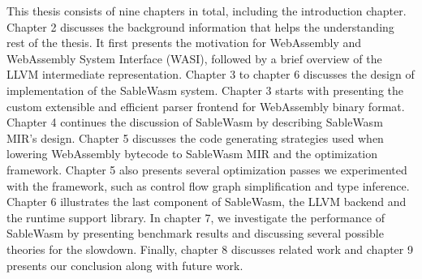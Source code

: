 This thesis consists of nine chapters in total, including the introduction
chapter.
Chapter 2 discusses the background information that helps the
understanding rest of the thesis. It first presents the motivation for
WebAssembly and WebAssembly System Interface (WASI), followed by a brief
overview of the LLVM intermediate representation.
Chapter 3 to chapter 6 discusses the design of implementation of the
SableWasm system. Chapter 3 starts with presenting the custom extensible and
efficient parser frontend for WebAssembly binary format.
Chapter 4 continues the discussion of SableWasm by describing SableWasm MIR's
design.
Chapter 5 discusses the code generating strategies used when
lowering WebAssembly bytecode to SableWasm MIR and the optimization framework.
Chapter 5 also presents several optimization passes we experimented with the
framework, such as control flow graph simplification and type inference.
Chapter 6 illustrates the last component of SableWasm, the LLVM backend and the
runtime support library.
In chapter 7, we investigate the performance of SableWasm by presenting
benchmark results and discussing several possible theories for the slowdown.
Finally, chapter 8 discusses related work and chapter 9 presents our conclusion
along with future work.